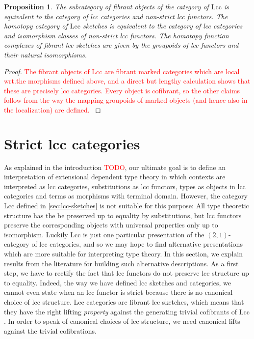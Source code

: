 \documentclass{article}
\newcommand{\todo}[1]{\textcolor{red}{#1}}
\newtheorem{proposition}{Proposition}
\begin{document}
\begin{proposition}
  The subcategory of fibrant objects of the category of $\mathrm{Lcc}$ is equivalent to the category of lcc categories and non-strict lcc functors.
  The homotopy category of $\mathrm{Lcc}$ sketches is equivalent to the category of lcc categories and isomorphism classes of non-strict lcc functors.
  The homotopy function complexes of fibrant lcc sketches are given by the groupoids of lcc functors and their natural isomorphisms.
\end{proposition}
\begin{proof}
  \todo{
    The fibrant objects of $\mathrm{Lcc}$ are fibrant marked categories which are local wrt.\@ the morphisms defined above, and a direct but lengthy calculation shows that these are precisely lcc categories.
    Every object is cofibrant, so the other claims follow from the way the mapping groupoids of marked objects (and hence also in the localization) are defined.
  }
\end{proof}

\section{Strict lcc categories}
\label{sec:strict-lcc-categories}

As explained in the introduction \todo{TODO}, our ultimate goal is to define an interpretation of extensional dependent type theory in which contexts are interpreted as lcc categories, substitutions as lcc functors, types as objects in lcc categories and terms as morphisms with terminal domain.
However, the category $\mathrm{Lcc}$ defined in \ref{sec:lcc-sketches} is not suitable for this purpose:
All type theoretic structure has the be preserved up to equality by substitutions, but lcc functors preserve the corresponding objects with universal properties only up to isomorphism.
Luckily $\mathrm{Lcc}$ is just one particular presentation of the $(2, 1)$-category of lcc categories, and so we may hope to find alternative presentations which are more suitable for interpreting type theory.
In this section, we explain results from the literature for building such alternative descriptions.
As a first step, we have to rectify the fact that lcc functors do not preserve lcc structure up to equality.
Indeed, the way we have defined lcc sketches and categories, we cannot even state when an lcc functor is strict because there is no canonical choice of lcc structure.
Lcc categories are fibrant lcc sketches, which means that they have the right lifting \emph{property} against the generating trivial cofibrants of $\mathrm{Lcc}$.
In order to speak of canonical choices of lcc structure, we need canonical lifts against the trivial cofibrations.
\end{document}
